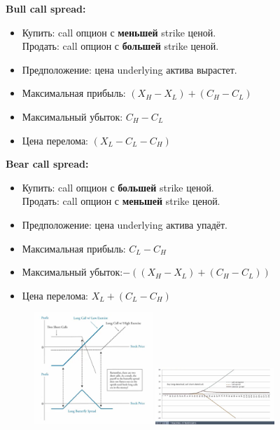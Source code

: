 \documentclass{article}
\begin{document}
 \textbf{Bull call spread:}
 \begin{itemize}
 \item Купить: call опцион с \textbf{меньшей} strike ценой.\\
Продать: call опцион с \textbf{большей} strike ценой.
\item Предположение: цена underlying актива вырастет.
\item Максимальная прибыль: $ (X_H - X_L) + (C_H - C_L) $
\item Максимальный убыток: $ C_H - C_L $
\item Цена перелома: $ (X_L -C_L - C_H) $
\end{itemize}

\textbf{Bear call spread:}
 \begin{itemize}
 \item Купить: call опцион с \textbf{большей} strike ценой.\\
Продать: call опцион с \textbf{меньшей} strike ценой.
\item Предположение: цена underlying актива упадёт.
\item Максимальная прибыль: $ C_L - C_H $
\item Максимальный убыток:$ -((X_H - X_L) + (C_H - C_L)) $
\item Цена перелома: $ X_L +(C_L - C_H) $
\end{itemize}
 \newpage
 
\begin{figure}
    \centering    \includegraphics[width=0.4\textwidth]{long butterfly spread.png}
    \centering    \includegraphics[width=0.4\textwidth]{calendar spread.png}
\end{figure}
\end{document}
